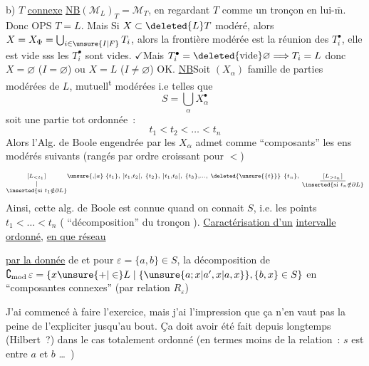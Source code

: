 b) $T$ \uline{connexe}\quad {} \uline{NB}\quad $(\mathcal M_{L})_T=\mathcal M_T$,
en regardant $T$ comme un tronçon en lui-$\overline{\text{m}}$.  Donc OPS $T=L$. Mais Si $X\subset\deleted{L}T$ modéré,
alors \unsure{:}  $X=X_{\Phi}=\bigcup_{i\in\unsure{I|F}}T_i$, alors  la frontière modérée est la réunion des \deleted{$\unsure{\partial}$} $T_i^\bullet$,
elle est vide sss les $T_i^\bullet$ sont vides. $\checkmark$Mais $T_i^\bullet=\deleted{\text{vide}}\varnothing\Longrightarrow T_i=L$ donc $X=\varnothing$ ($I=\varnothing$) ou $X=L$ ($I\ne\varnothing$) OK.
\uline{NB}\qquad Soit $(X_\alpha)$ famille  de parties modérées de $L$,  mutuell\textsuperscript{t} modérées i.e telles que
\[
S=\bigcup_\alpha X_\alpha^{\bullet}
\]
soit une partie tot ordonnée~:
\[
t_1<t_2<\ldots<t_n
\]
Alors l'Alg. de Boole engendrée par les $X_\alpha$  admet comme   ``composants'' les ens modérés  suivants (rangés par ordre croissant pour $<$)
\[
\scriptstyle
\underset{\substack{\vert\\\inserted{\text{si }t_1\notin\partial L}}}{[L_{<t_1}]}\unsure{,|a}\;
\{t_1\},\ ]t_1,t_2[,\ \{t_2\},\ ]t_{1},t_3[,\ \{t_3\},\ldots,\
\deleted{\unsure{\{t\}}}\ \{t_n\},\
\underset{\substack{\rule{3em}{0.35pt}\\\inserted{\text{si }t_n\notin\partial L}}}{[L_{>t_n}]}
\]
Ainsi, cette alg. de Boole est connue quand on connait $S$, i.e. les points $t_1<\ldots<t_n$ ( ``décomposition''  du tronçon ).
\uline{Caractérisation d'un} \uline{intervalle}  \uline{ordonné}, \uline{en  que réseau}

\uline{par la donnée} de
\diagram{\begin{tikzcd}[ampersand replacement=\&,row sep=0.75em,column sep=0.15em]
S \& {}\subset\unsure{\mathcal P|\mathscr P|\mathrm P}_2(L)\\
\makebox[0pt][c]{\(\operatorname{Drap}_2(L)\)}\arrow[u,equal] \&
\end{tikzcd}}
et pour $\varepsilon=\{a,b\}\in S$, la décomposition de  $\complement_{\mathrm{mod}}\,\varepsilon=\{x\unsure{+|\in}L\mid\{\unsure{a;x|a',x|a,x}\},\{b,x\}\in S\}$ en ``composantes connexes'' (par relation $R_\varepsilon$)

J'ai commencé à faire l'exercice, mais j'ai l'impression que ça n'en vaut pas la peine de l'expliciter jusqu'au bout. Ça doit avoir été fait depuis longtemps (Hilbert~?) dans le cas totalement ordonné  (en termes  moins de la relation~: $s$ est entre $a$ et $b$ \ldots\ )
